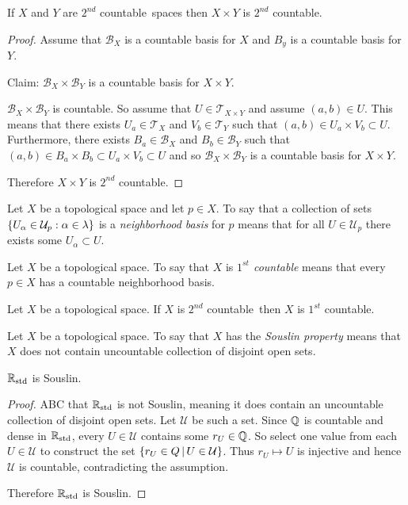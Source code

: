 \documentclass[letterpaper,12pt,fleqn]{article}
\newcommand{\T}{\mathscr{T}}
\newcommand{\B}{\mathcal{B}}
\newcommand{\U}{\mathcal{U}}
\renewcommand{\sc}{\(2^{nd}\) countable}
\newcommand{\fc}{\(1^{st}\) countable}
\newcommand{\Rs}{\R_{\text{std}}}
\renewcommand{\a}{\alpha}
\renewcommand{\l}{\lambda}
\begin{document}
\begin{theorem}
  If \(X\) and \(Y\) are \sc\ spaces then \(X\times Y\) is \sc.
\end{theorem}

\begin{proof}
  Assume that \(\B_X\) is a countable basis for \(X\) and \(B_y\) is a countable basis for \(Y\).

  Claim: \(\B_X\times\B_Y\) is a countable basis for \(X\times Y\).

  \(\B_X\times\B_Y\) is countable.  So assume that \(U\in\T_{X\times Y}\) and assume \((a,b)\in U\).  This means that
  there exists \(U_a\in\T_X\) and \(V_b\in\T_Y\) such that \((a,b)\in U_a\times V_b\subset U\).  Furthermore, there
  exists \(B_a\in\B_X\) and \(B_b\in\B_Y\) such that \((a,b)\in B_a\times B_b\subset U_a\times V_b\subset U\) and
  so \(\B_X\times\B_Y\) is a countable basis for \(X\times Y\).

  Therefore \(X\times Y\) is \sc.
\end{proof}

\begin{definition}
  Let \(X\) be a topological space and let \(p\in X\).  To say that a collection of sets
  \(\set{U_{\a}\in\U_p : \a\in\l}\) is a \emph{neighborhood basis} for \(p\) means that for all \(U\in\U_p\)
  there exists some \(U_{\a}\subset U\).
\end{definition}

\begin{definition}[\(1^{st}\) Countable]
  Let \(X\) be a topological space.  To say that \(X\) is \emph{\fc} means that every \(p\in X\) has a countable
  neighborhood basis.
\end{definition}

\begin{theorem}
  Let \(X\) be a topological space.  If \(X\) is \sc\ then \(X\) is \fc.
\end{theorem}

\begin{definition}[Souslin]
  Let \(X\) be a topological space.  To say that \(X\) has the \emph{Souslin property} means that \(X\) does not
  contain uncountable collection of disjoint open sets.
\end{definition}

\begin{theorem}
  \(\Rs\) is Souslin.
\end{theorem}

\begin{proof}
  ABC that \(\Rs\) is not Souslin, meaning it does contain an uncountable collection of disjoint open sets.  Let
  \(\U\) be such a set.  Since \(\mathbb{Q}\) is countable and dense in \(\Rs\), every \(U\in\U\) contains some
  \(r_U\in\mathbb{Q}\).  So select one value from each \(U\in\U\) to construct the set \(\setb{r_U\in Q}{U\in\U}\).
  Thus \(r_U\mapsto U\) is injective and hence \(\U\) is countable, contradicting the assumption.

  Therefore \(\Rs\) is Souslin.
\end{proof}
\end{document}
